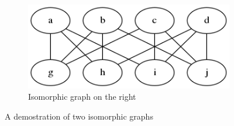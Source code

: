 \begin{figure}[!tbp]
\begin{subfigure}[b]{0.4\textwidth}
    \includegraphics[width=\textwidth]{isomorphismright}
    \caption{Isomorphic graph on the right}
    \label{fig:isomorphism}
  \end{subfigure}
  \caption{A demostration of two isomorphic graphs}
\end{figure}

\newpage